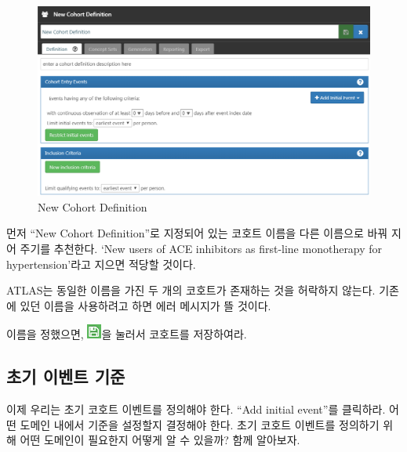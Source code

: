 \documentclass[11pt]{book}
\theoremstyle{definition}
\theoremstyle{definition}
\theoremstyle{definition}
\theoremstyle{remark}
\let\BeginKnitrBlock\begin \let\EndKnitrBlock\end
\begin{document}
\begin{figure}

{\centering \includegraphics[width=1\linewidth]{images/Cohorts/ATLAS-defineacohort} 

}

\caption{New Cohort Definition}\label{fig:ATLASdefineacohort}
\end{figure}

먼저 ``New Cohort Definition''로 지정되어 있는 코호트 이름을 다른
이름으로 바꿔 지어 주기를 추천한다. `New users of ACE inhibitors as
first-line monotherapy for hypertension'라고 지으면 적당할 것이다.

\BeginKnitrBlock{rmdimportant}
ATLAS는 동일한 이름을 가진 두 개의 코호트가 존재하는 것을 허락하지
않는다. 기존에 있던 이름을 사용하려고 하면 에러 메시지가 뜰 것이다.
\EndKnitrBlock{rmdimportant}

이름을 정했으면, \includegraphics{images/Cohorts/save.png}을 눌러서
코호트를 저장하여라.

\subsection{초기 이벤트 기준}\label{--}

이제 우리는 초기 코호트 이벤트를 정의해야 한다. ``Add initial event''를
클릭하라. 어떤 도메인 내에서 기준을 설정할지 결정해야 한다. 초기 코호트
이벤트를 정의하기 위해 어떤 도메인이 필요한지 어떻게 알 수 있을까? 함께
알아보자.
\end{document}
